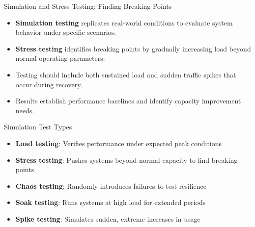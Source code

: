 \documentclass{beamer}
\begin{document}
\begin{frame}{Simulation and Stress Testing: Finding Breaking Points}
    \begin{itemize}
        \item \textbf{Simulation testing} replicates real-world conditions to evaluate system behavior under specific scenarios.
        \item \textbf{Stress testing} identifies breaking points by gradually increasing load beyond normal operating parameters.
        \item Testing should include both sustained load and sudden traffic spikes that occur during recovery.
        \item Results establish performance baselines and identify capacity improvement needs.
    \end{itemize}
    
    \begin{exampleblock}{Simulation Test Types}
        \scriptsize
        \begin{itemize}
            \item \textbf{Load testing}: Verifies performance under expected peak conditions
            \item \textbf{Stress testing}: Pushes systems beyond normal capacity to find breaking points
            \item \textbf{Chaos testing}: Randomly introduces failures to test resilience
            \item \textbf{Soak testing}: Runs systems at high load for extended periods
            \item \textbf{Spike testing}: Simulates sudden, extreme increases in usage
        \end{itemize}
    \end{exampleblock}
\end{frame}
\end{document}
